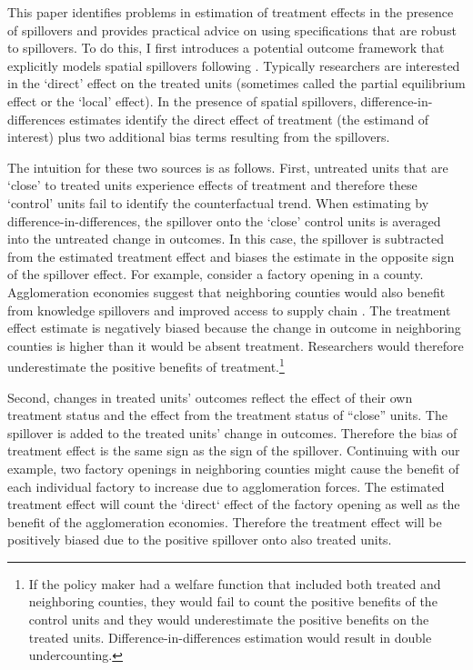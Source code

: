 \documentclass[11pt]{article}
\begin{document}
This paper identifies problems in estimation of treatment effects in the presence of spillovers and provides practical advice on using specifications that are robust to spillovers. To do this, I first introduces a potential outcome framework that explicitly models spatial spillovers following \citet{Vazquez-Bare_2019}. Typically researchers are interested in the `direct' effect on the treated units (sometimes called the partial equilibrium effect or the `local' effect). In the presence of spatial spillovers, difference-in-differences estimates identify the direct effect of treatment (the estimand of interest) plus two additional bias terms resulting from the spillovers.

The intuition for these two sources is as follows. First, untreated units that are `close' to treated units experience effects of treatment and therefore these `control' units fail to identify the counterfactual trend. When estimating by difference-in-differences, the spillover onto the `close' control units is averaged into the untreated change in outcomes. In this case, the spillover is subtracted from the estimated treatment effect and biases the estimate in the opposite sign of the spillover effect. For example, consider a factory opening in a county. Agglomeration economies suggest that neighboring counties would also benefit from knowledge spillovers and improved access to supply chain \citep{Duranton_Puga_2003}. The treatment effect estimate is negatively biased because the change in outcome in neighboring counties is higher than it would be absent treatment. Researchers would therefore underestimate the positive benefits of treatment.\footnote{If the policy maker had a welfare function that included both treated and neighboring counties, they would fail to count the positive benefits of the control units and they would underestimate the positive benefits on the treated units. Difference-in-differences estimation would result in double undercounting.}

Second, changes in treated units' outcomes reflect the effect of their own treatment status and the effect from the treatment status of ``close'' units. The spillover is added to the treated units' change in outcomes. Therefore the bias of treatment effect is the same sign as the sign of the spillover. Continuing with our example, two factory openings in neighboring counties might cause the benefit of each individual factory to increase due to agglomeration forces. The estimated treatment effect will count the `direct` effect of the factory opening as well as the benefit of the agglomeration economies. Therefore the treatment effect will be positively biased due to the positive spillover onto also treated units. 
\end{document}
